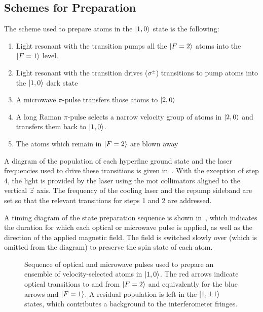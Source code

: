 \subsection{Schemes for Preparation}\label{subsec:prep_schemes}
The scheme used to prepare atoms in the \(\ket{1,0}\) state is the
following:
\begin{enumerate}
    \item Light resonant with the  transition pumps all
      the $\ket{F=2}$ atoms
      into the \(\ket{F=1}\) level.
    \item Light resonant with the  transition drives (\(\sigma^{\pm}\)) transitions to pump atoms into the \(\ket{1,0}\) dark state
    \item A microwave $\pi$-pulse transfers those atoms to \(\ket{2,0}\)
    \item A long Raman $\pi$-pulse selects a narrow velocity group of
      atoms in $\ket{2,0}$ and transfers them back to $\ket{1,0}$.
    \item The atoms which remain in \(\ket{F=2}\) are blown away
\end{enumerate}
A diagram of the population of each hyperfine ground state and the
laser frequencies used to drive these transitions is given
in~. With the exception of step 4, the light
is provided by the \Muquans laser using the \ac{mot} collimators
aligned to the vertical \(\vec{z}\) axis. The frequency of the cooling
laser and the repump sideband are set so that the relevant transitions
for steps 1 and 2 are addressed. 
\par\noindent
A timing diagram of the state preparation sequence is shown
in~, which indicates the
duration for which each optical or microwave pulse is applied, as well
as the direction of the applied magnetic field. The field is switched
slowly over  (which is omitted from the
diagram) to preserve the spin state of each atom. 
\begin{figure}[!htbp]
    \centering
    \fontsize{32pt}{32pt}
    \resizebox{0.8\textwidth}{!}{}
    \caption[State preparation pulse sequence]{Sequence of optical and
    microwave pulses used to prepare an ensemble of velocity-selected
  atoms in \(\ket{1,0}\). The red arrows indicate optical transitions
to and from \(\ket{F=2}\) and equivalently for the blue arrows and
\(\ket{F=1}\). A residual population is left in the \(\ket{1,\pm 1}\)
states, which contributes a background to the interferometer fringes.}
    \label{fig:state_prep}
\end{figure}
